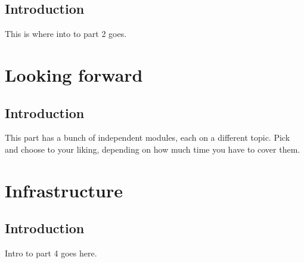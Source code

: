\documentclass[]{book}
\theoremstyle{definition}
\theoremstyle{definition}
\theoremstyle{definition}
\theoremstyle{remark}
\begin{document}
\chapter{Introduction}\label{rigor-intro}

This is where into to part 2 goes.

\part{Looking forward}\label{part-looking-forward}

\chapter{Introduction}\label{forward-intro}

This part has a bunch of independent modules, each on a different topic.
Pick and choose to your liking, depending on how much time you have to
cover them.

\part{Infrastructure}\label{part-infrastructure}

\chapter{Introduction}\label{infra-intro}

Intro to part 4 goes here.


\end{document}
